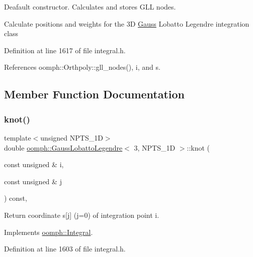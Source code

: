 Deafault constructor. Calculates and stores G\+LL nodes. 

Calculate positions and weights for the 3D \hyperlink{classoomph_1_1Gauss}{Gauss} Lobatto Legendre integration class 

Definition at line 1617 of file integral.\+h.



References oomph\+::\+Orthpoly\+::gll\+\_\+nodes(), i, and s.



\subsection{Member Function Documentation}
\mbox{\label{classoomph_1_1GaussLobattoLegendre_3_013_00_01NPTS__1D_01_4_a87943de05b72f4fc59080ef0d16ad7f7}} 
\subsubsection{\texorpdfstring{knot()}{knot()}}
{\footnotesize\ttfamily template$<$unsigned N\+P\+T\+S\+\_\+1D$>$ \\
double \hyperlink{classoomph_1_1GaussLobattoLegendre}{oomph\+::\+Gauss\+Lobatto\+Legendre}$<$ 3, N\+P\+T\+S\+\_\+1D $>$\+::knot (\begin{DoxyParamCaption}\item[{const unsigned \&}]{i,  }\item[{const unsigned \&}]{j }\end{DoxyParamCaption}) const\hspace{0.3cm}{\ttfamily [inline]}, {\ttfamily [virtual]}}



Return coordinate s\mbox{[}j\mbox{]} (j=0) of integration point i. 



Implements \hyperlink{classoomph_1_1Integral_a1a2122f99a87c18649bafdd9ed739758}{oomph\+::\+Integral}.



Definition at line 1603 of file integral.\+h.



